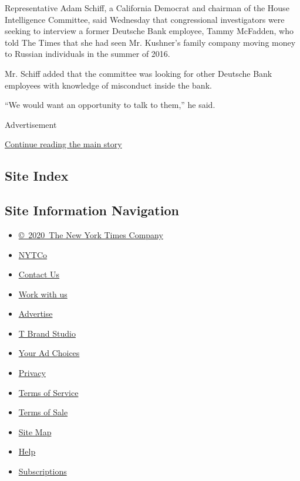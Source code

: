 Representative Adam Schiff, a California Democrat and chairman of the
House Intelligence Committee, said Wednesday that congressional
investigators were seeking to interview a former Deutsche Bank employee,
Tammy McFadden, who told The Times that she had seen Mr. Kushner's
family company moving money to Russian individuals in the summer of
2016.

Mr. Schiff added that the committee was looking for other Deutsche Bank
employees with knowledge of misconduct inside the bank.

``We would want an opportunity to talk to them,'' he said.

Advertisement

\protect\hyperlink{after-bottom}{Continue reading the main story}

\hypertarget{site-index}{%
\subsection{Site Index}\label{site-index}}

\hypertarget{site-information-navigation}{%
\subsection{Site Information
Navigation}\label{site-information-navigation}}

\begin{itemize}
\tightlist
\item
  \href{https://help.nytimes3xbfgragh.onion/hc/en-us/articles/115014792127-Copyright-notice}{©~2020~The
  New York Times Company}
\end{itemize}

\begin{itemize}
\tightlist
\item
  \href{https://www.nytco.com/}{NYTCo}
\item
  \href{https://help.nytimes3xbfgragh.onion/hc/en-us/articles/115015385887-Contact-Us}{Contact
  Us}
\item
  \href{https://www.nytco.com/careers/}{Work with us}
\item
  \href{https://nytmediakit.com/}{Advertise}
\item
  \href{http://www.tbrandstudio.com/}{T Brand Studio}
\item
  \href{https://www.nytimes3xbfgragh.onion/privacy/cookie-policy\#how-do-i-manage-trackers}{Your
  Ad Choices}
\item
  \href{https://www.nytimes3xbfgragh.onion/privacy}{Privacy}
\item
  \href{https://help.nytimes3xbfgragh.onion/hc/en-us/articles/115014893428-Terms-of-service}{Terms
  of Service}
\item
  \href{https://help.nytimes3xbfgragh.onion/hc/en-us/articles/115014893968-Terms-of-sale}{Terms
  of Sale}
\item
  \href{https://spiderbites.nytimes3xbfgragh.onion}{Site Map}
\item
  \href{https://help.nytimes3xbfgragh.onion/hc/en-us}{Help}
\item
  \href{https://www.nytimes3xbfgragh.onion/subscription?campaignId=37WXW}{Subscriptions}
\end{itemize}
